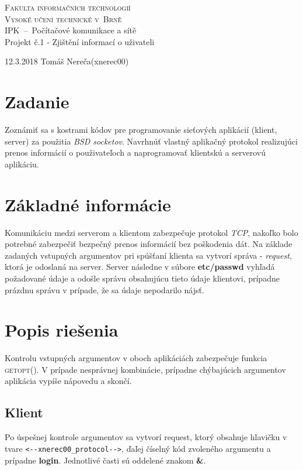 \documentclass[a4paper, 11pt]{article}
\begin{document}
\begin{titlepage}
\begin{center}
	
	\textsc{\Huge Fakulta informačních technologií\\[3.5mm]
			Vysoké učení technické v~Brně}
	\\[79mm]
	{\LARGE IPK \,--\, Počítačové komunikace a sítě\\[1.5mm]
	Projekt č.1 - Zjištění informací o uživateli}
	\vfill
\end{center}
{\Large 12.3.2018 \hfill Tomáš Nereča(xnerec00)}
\\[-4mm]
\end{titlepage}

\section{Zadanie}
Zoznámiť sa s kostrami kódov pre programovanie sieťových aplikácií (klient, server) za použitia \emph{BSD socketov}. Navrhnúť vlastný aplikačný protokol realizujúci prenos informácií o použivateľoch a naprogramovať klientskú a serverovú aplikáciu.

\section{Základné informácie}
Komunikáciu medzi serverom a klientom zabezpečuje protokol \emph{TCP}, nakoľko bolo potrebné zabezpečiť bezpečný prenos informácií bez poškodenia dát. Na základe zadaných vstupných argumentov pri spúšťaní klienta sa vytvorí správa - \emph{request}, ktorá je odoslaná na server. Server následne v súbore \textbf{etc/passwd} vyhľadá požadované údaje a odošle správu obsahujúcu tieto údaje klientovi, prípadne prázdnu správu v prípade, že sa údaje nepodarilo nájsť.

\section{Popis riešenia}
Kontrolu vstupných argumentov v oboch aplikáciách zabezpečuje funkcia \textsc{getopt()}. V prípade nesprávnej kombinácie, prípadne chýbajúcich argumentov aplikácia vypíše nápovedu a skončí.

\subsection{Klient}
Po úspešnej kontrole argumentov sa vytvorí request, ktorý obsahuje hlavičku v tvare \verb|<--xnerec00_protocol-->|, ďaľej číselný kód zvoleného argumentu a prípadne \textbf{login}. Jednotlivé časti sú oddelené znakom \textbf{\&}.
\end{document}
